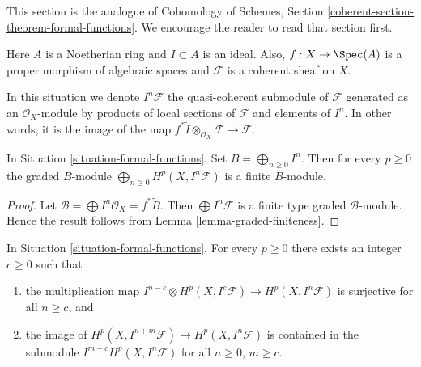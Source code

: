 \noindent
This section is the analogue of
Cohomology of Schemes, Section \ref{coherent-section-theorem-formal-functions}.
We encourage the reader to read that section first.

\begin{situation}
\label{situation-formal-functions}
Here $A$ is a Noetherian ring and $I \subset A$ is an ideal.
Also, $f : X \to \Spec(A)$ is a proper morphism of algebraic spaces
and $\mathcal{F}$ is a coherent sheaf on $X$.
\end{situation}

\noindent
In this situation we denote $I^n\mathcal{F}$ the quasi-coherent
submodule of $\mathcal{F}$ generated as an $\mathcal{O}_X$-module
by products of local sections of $\mathcal{F}$ and elements of $I^n$.
In other words, it is the image of the map
$f^*\widetilde{I} \otimes_{\mathcal{O}_X} \mathcal{F} \to \mathcal{F}$.

\begin{lemma}
\label{lemma-cohomology-powers-ideal-times-F}
In Situation \ref{situation-formal-functions}.
Set $B = \bigoplus_{n \geq 0} I^n$.
Then for every $p \geq 0$ the graded $B$-module
$\bigoplus_{n \geq 0} H^p(X, I^n\mathcal{F})$ is
a finite $B$-module.
\end{lemma}

\begin{proof}
Let $\mathcal{B} = \bigoplus I^n\mathcal{O}_X = f^*\widetilde{B}$.
Then $\bigoplus I^n\mathcal{F}$ is a finite type
graded $\mathcal{B}$-module. Hence the result follows
from Lemma \ref{lemma-graded-finiteness}.
\end{proof}

\begin{lemma}
\label{lemma-cohomology-powers-ideal-application}
In Situation \ref{situation-formal-functions}.
For every $p \geq 0$ there exists an integer $c \geq 0$ such that
\begin{enumerate}
\item the multiplication map
$I^{n - c} \otimes H^p(X, I^c\mathcal{F}) \to H^p(X, I^n\mathcal{F})$
is surjective for all $n \geq c$, and
\item the image of $H^p(X, I^{n + m}\mathcal{F}) \to H^p(X, I^n\mathcal{F})$
is contained in the submodule $I^{m - c} H^p(X, I^n\mathcal{F})$
for all $n \geq 0$, $m \geq c$.
\end{enumerate}
\end{lemma}

